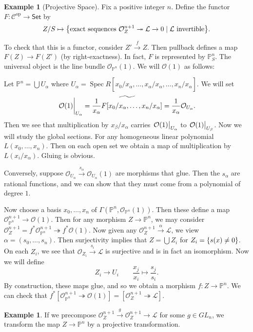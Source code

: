\documentclass[leqno, openany]{memoir}
\theoremstyle{definition}
\newtheorem{exm}[thm]{Example}
\theoremstyle{remark}
\theoremstyle{plain}
\theoremstyle{definition}
\theoremstyle{remark}
\renewcommand{\P}{\mathbb{P}}
\newcommand{\mc}[1]{\mathcal{#1}}
\newcommand{\mr}[1]{\mathrm{#1}}
\newcommand{\ms}[1]{\mathsf{#1}}
\newcommand{\wt}[1]{\widetilde{#1}}
\newcommand{\wh}[1]{\widehat{#1}}
\DeclareMathOperator{\Spec}{Spec}
\begin{document}
\begin{exm}[Projective Space]
    Fix a positive integer $n$. Define the functor $F \colon \mc{C}^{\mr{op}} \to \ms{Set}$ by
    \[ Z/S \mapsto \qty{\text{exact sequences}\ \mc{O}_Z^{n+1} \twoheadrightarrow \mc{L} \to 0 \mid \mc{L}\ \text{invertible}}. \]

    To check that this is a functor, consider $Z' \xrightarrow{f} Z$. Then pullback defines a map $F(Z) \to F(Z')$ (by right-exactness). In fact, $F$ is represented by $\P^n_S$. The universal object is the line bundle $\mc{O}_{\P^n}(1)$. We will $\mc{O}(1)$ as follows:

    Let $\P^n = \bigcup U_{\alpha}$ where $U_{\alpha} = \Spec R[x_0/x_{\alpha}, \ldots, \wh{x_{\alpha}/x_{\alpha}}, \ldots, x_n/x_{\alpha}]$. We will set
    \[ \eval{\mc{O}(1)}_{U_{\alpha}} = \wt{\frac{1}{x_{\alpha}} F[x_0/x_{\alpha}, \ldots, x_n/x_{\alpha}]} = \frac{1}{x_{\alpha}} \mc{O}_{U_{\alpha}}. \]
    Then we see that multiplication by $x_{\beta}/x_{\alpha}$ carries $\eval{\mc{O}(1)}_{U_{\alpha}}$ to $\eval{\mc{O}(1)}_{U_{\beta}}$. Now we will study the global sections. For any homogeneous linear polynomial $L(x_0, \ldots, x_n)$. Then on each open set we obtain a map of multiplication by $L(x_i/x_{\alpha})$. Gluing is obvious.

    Conversely, suppose $\mc{O}_{U_{\alpha}} \xrightarrow{s_{\alpha}} \mc{O}_{U_{\alpha}}(1)$ are morphisms that glue. Then the $s_{\alpha}$ are rational functions, and we can show that they must come from a polynomial of degree $1$.

    Now choose a basis $x_0, \ldots, x_n$ of $\Gamma(\P^n, \mc{O}_{\P^n}(1))$. Then these define a map $\mc{O}_{\P^n}^{n+1} \to \mc{O}(1)$. Then for any morphism $Z \to \P^n$, we may consider $\mc{O}_Z^{n+1} = f^* \mc{O}_{\P^n}^{n+1} \twoheadrightarrow f^* \mc{O}(1)$. Now given any $\mc{O}_Z^{n+1} \xrightarrow{\alpha} \mc{L}$, we view $\alpha = (s_0, \ldots, s_n)$. Then surjectivity implies that $Z = \bigcup Z_i$ for $Z_i = \qty{s(x) \neq 0}$. On each $Z_i$, we see that $\mc{O}_{Z_i} \xrightarrow{s_i} \mc{L}$ is surjective and is in fact an isomorphism. Now we will define
    \[ Z_i \to U_i \qquad \frac{x_j}{x_{i}} \mapsto \frac{s_j}{s_i}. \]
    By construction, these maps glue, and so we obtain a morphism $f \colon Z \to \P^n$. We can check that $f^* [\mc{O}_{\P^n}^{n+1} \twoheadrightarrow \mc{O}(1)] = [\mc{O}_Z^{n+1} \twoheadrightarrow \mc{L}]$.
\end{exm}

\begin{exm}
    If we precompose $\mc{O}_{Z}^{n+1} \xrightarrow{g} \mc{O}_Z^{n+1} \to \mc{L}$ for some $g \in GL_n$, we transform the map $Z \to \P^n$ by a projective transformation.
\end{exm}
\end{document}
